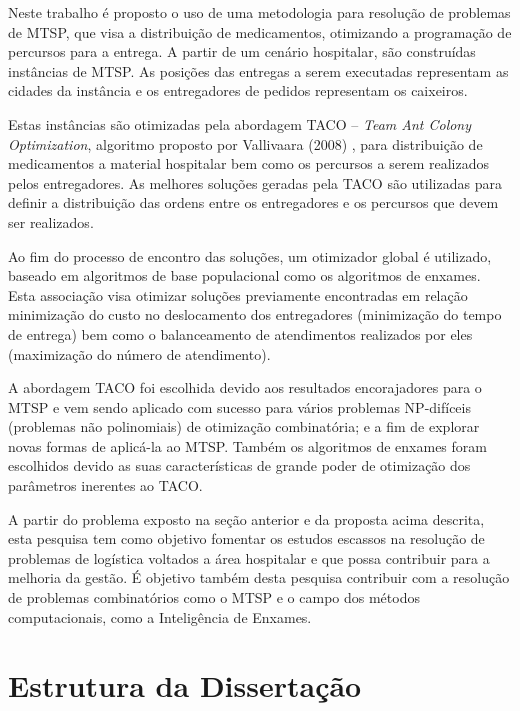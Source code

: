 Neste trabalho é proposto o uso de uma metodologia para resolução de problemas de MTSP, que visa a distribuição de medicamentos, otimizando a programação de percursos para a entrega. A partir de um cenário hospitalar, são construídas instâncias de MTSP. As posições das entregas a serem executadas representam as cidades da instância e os entregadores de pedidos representam os caixeiros.

Estas instâncias são otimizadas pela abordagem TACO – \textit{Team Ant Colony Optimization}, algoritmo proposto por Vallivaara (2008) \cite{vallivaara2008team}, para distribuição de medicamentos a material hospitalar bem como os percursos a serem realizados pelos entregadores. As melhores soluções geradas pela TACO são utilizadas para definir a distribuição das ordens entre os entregadores e os percursos que devem ser realizados.

Ao fim do processo de encontro das soluções, um otimizador global é utilizado, baseado em algoritmos de base populacional como os algoritmos de enxames. Esta associação visa otimizar soluções previamente encontradas em relação minimização do custo no deslocamento dos entregadores (minimização do tempo de entrega) bem como o balanceamento de atendimentos realizados por eles (maximização do número de atendimento).

A abordagem TACO foi escolhida devido aos resultados encorajadores para o MTSP e vem sendo aplicado com sucesso para vários problemas NP-difíceis (problemas não polinomiais) de otimização combinatória; e a fim de explorar novas formas de aplicá-la ao MTSP. Também os algoritmos de enxames foram escolhidos devido as suas características de grande poder de otimização dos parâmetros inerentes ao TACO.

A partir do problema exposto na seção anterior e da proposta acima descrita, esta pesquisa tem como objetivo fomentar os estudos escassos na resolução de problemas de logística voltados a área hospitalar e que possa contribuir para a melhoria da gestão. É objetivo também desta pesquisa contribuir com a resolução de problemas combinatórios como o MTSP e o campo dos métodos computacionais, como a Inteligência de Enxames.

\section{Estrutura da Dissertação}
\label{sec-estrutura}

